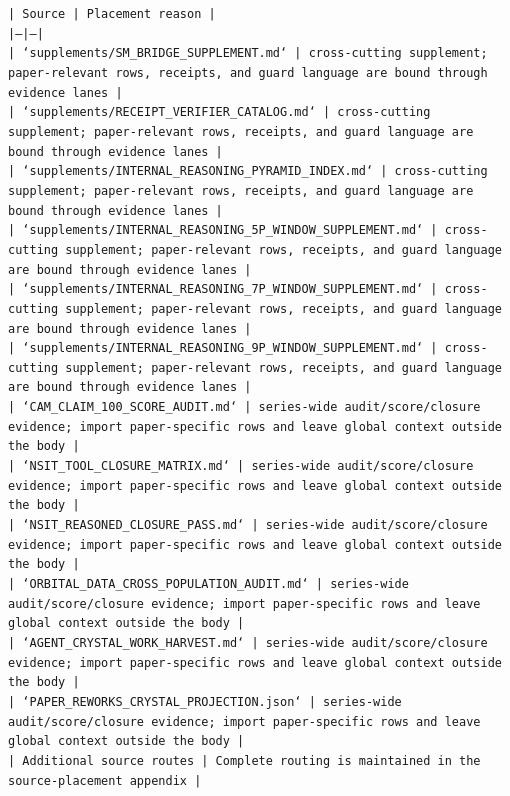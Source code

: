 \documentclass[11pt]{article}
\begin{document}
\noindent\texttt{| Source | Placement reason |}\\
\noindent\texttt{|---|---|}\\
\noindent\texttt{| `supplements/SM\_BRIDGE\_SUPPLEMENT.md` | cross-cutting supplement; paper-relevant rows, receipts, and guard language are bound through evidence lanes |}\\
\noindent\texttt{| `supplements/RECEIPT\_VERIFIER\_CATALOG.md` | cross-cutting supplement; paper-relevant rows, receipts, and guard language are bound through evidence lanes |}\\
\noindent\texttt{| `supplements/INTERNAL\_REASONING\_PYRAMID\_INDEX.md` | cross-cutting supplement; paper-relevant rows, receipts, and guard language are bound through evidence lanes |}\\
\noindent\texttt{| `supplements/INTERNAL\_REASONING\_5P\_WINDOW\_SUPPLEMENT.md` | cross-cutting supplement; paper-relevant rows, receipts, and guard language are bound through evidence lanes |}\\
\noindent\texttt{| `supplements/INTERNAL\_REASONING\_7P\_WINDOW\_SUPPLEMENT.md` | cross-cutting supplement; paper-relevant rows, receipts, and guard language are bound through evidence lanes |}\\
\noindent\texttt{| `supplements/INTERNAL\_REASONING\_9P\_WINDOW\_SUPPLEMENT.md` | cross-cutting supplement; paper-relevant rows, receipts, and guard language are bound through evidence lanes |}\\
\noindent\texttt{| `CAM\_CLAIM\_100\_SCORE\_AUDIT.md` | series-wide audit/score/closure evidence; import paper-specific rows and leave global context outside the body |}\\
\noindent\texttt{| `NSIT\_TOOL\_CLOSURE\_MATRIX.md` | series-wide audit/score/closure evidence; import paper-specific rows and leave global context outside the body |}\\
\noindent\texttt{| `NSIT\_REASONED\_CLOSURE\_PASS.md` | series-wide audit/score/closure evidence; import paper-specific rows and leave global context outside the body |}\\
\noindent\texttt{| `ORBITAL\_DATA\_CROSS\_POPULATION\_AUDIT.md` | series-wide audit/score/closure evidence; import paper-specific rows and leave global context outside the body |}\\
\noindent\texttt{| `AGENT\_CRYSTAL\_WORK\_HARVEST.md` | series-wide audit/score/closure evidence; import paper-specific rows and leave global context outside the body |}\\
\noindent\texttt{| `PAPER\_REWORKS\_CRYSTAL\_PROJECTION.json` | series-wide audit/score/closure evidence; import paper-specific rows and leave global context outside the body |}\\
\noindent\texttt{| Additional source routes | Complete routing is maintained in the source-placement appendix |}\\
\end{document}
